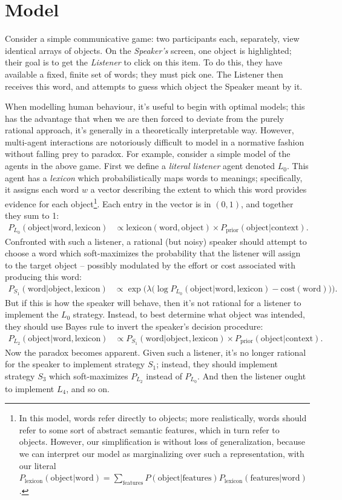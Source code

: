 \documentclass{article} %
\newcommand{\word}{\text{word}}
\newcommand{\obj}{\text{object}}
\newcommand{\lex}{\text{lexicon}}
\newcommand{\prior}{P_{\text{prior}}(\obj | \text{context})}
\begin{document}
\section{Model}

Consider a simple communicative game: two participants each,
separately, view identical arrays of objects. On the
\textit{Speaker's} screen, one object is highlighted; their goal is to
get the \textit{Listener} to click on this item. To do this, they have
available a fixed, finite set of words; they must pick one. The
Listener then receives this word, and attempts to guess which object
the Speaker meant by it.

When modelling human behaviour, it's useful to begin with optimal models; this has the advantage that when we are then forced to deviate from the purely rational approach, it's generally in a theoretically interpretable way. However, multi-agent interactions are notoriously difficult to model in a normative fashion without falling prey to paradox. For example, consider a simple model of the agents in the above game. First we define a \textit{literal listener} agent denoted $L_0$. This agent has a \textit{lexicon} which probabilistically maps words to meanings; specifically, it assigns each word $w$ a vector describing the extent to which this word provides evidence for each object\footnote{In this model, words refer directly to objects; more realistically, words should refer to some sort of abstract semantic features, which in turn refer to objects. However, our simplification is without loss of generalization, because we can interpret our model as marginalizing over such a representation, with our literal $P_\lex(\obj | \word) = \sum_\text{features} P(\obj | \text{features}) P_\lex(\text{features} | \word)$.}. Each entry in the vector is in $(0, 1)$, and together they sum to 1:
\begin{align*}
P_{L_0}(\obj | \word, \lex) &\propto \lex(\word, \obj) \times \prior.
\end{align*}
Confronted with such a listener, a rational (but noisy) speaker should attempt to choose a word which soft-maximizes the probability that the listener will assign to the target object -- possibly modulated by the effort or cost associated with producing this word:
\begin{align*}
P_{S_1}(\word | \obj, \lex) &\propto \exp\Big(\lambda \big(\log P_{L_0}(\obj | \word, \lex) - \text{cost}(\word)\big)\Big).
\end{align*}
But if this is how the speaker will behave, then it's not rational for a listener to implement the $L_0$ strategy. Instead, to best determine what object was intended, they should use Bayes rule to invert the speaker's decision procedure:
\begin{align*}
P_{L_2}(\obj | \word, \lex) &\propto P_{S_1}(\word | \obj, \lex) \times \prior.
\end{align*}
Now the paradox becomes apparent. Given such a listener, it's no longer rational for the speaker to implement strategy $S_1$; instead, they should implement strategy $S_3$ which soft-maximizes $P_{L_2}$ instead of $P_{L_0}$. And then the listener ought to implement $L_4$, and so on.
\end{document}
